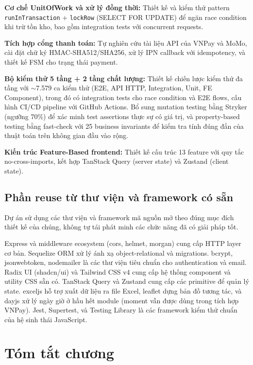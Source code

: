 \textbf{Cơ chế UnitOfWork và xử lý đồng thời:} Thiết kế và kiểm thử pattern \texttt{runInTransaction} + \texttt{lockRow} (SELECT FOR UPDATE) để ngăn race condition khi trừ tồn kho, bao gồm integration tests với concurrent requests.

\textbf{Tích hợp cổng thanh toán:} Tự nghiên cứu tài liệu API của VNPay và MoMo, cài đặt chữ ký HMAC-SHA512/SHA256, xử lý IPN callback với idempotency, và thiết kế FSM cho trạng thái payment.

\textbf{Bộ kiểm thử 5 tầng + 2 tầng chất lượng:} Thiết kế chiến lược kiểm thử đa tầng với $\sim$7.579 ca kiểm thử (E2E, API HTTP, Integration, Unit, FE Component), trong đó có integration tests cho race condition và E2E flows, cấu hình CI\slash CD pipeline với GitHub Actions. Bổ sung mutation testing bằng Stryker (ngưỡng 70\%) để xác minh test assertions thực sự có giá trị, và property-based testing bằng fast-check với 25 business invariants để kiểm tra tính đúng đắn của thuật toán trên không gian đầu vào rộng.

\textbf{Kiến trúc Feature-Based frontend:} Thiết kế cấu trúc 13 feature với quy tắc no-cross-imports, kết hợp TanStack Query (server state) và Zustand (client state).

\subsection{Phần reuse từ thư viện và framework có sẵn}

Dự án sử dụng các thư viện và framework mã nguồn mở theo đúng mục đích thiết kế của chúng, không tự tái phát minh các chức năng đã có giải pháp tốt.

Express và middleware ecosystem (cors, helmet, morgan) cung cấp HTTP layer cơ bản. Sequelize ORM xử lý ánh xạ object-relational và migrations. bcrypt, jsonwebtoken, nodemailer là các thư viện tiêu chuẩn cho authentication và email. Radix UI (shadcn/ui) và Tailwind CSS v4 cung cấp hệ thống component và utility CSS sẵn có. TanStack Query và Zustand cung cấp các primitive để quản lý state. exceljs hỗ trợ xuất dữ liệu ra file Excel, leaflet dựng bản đồ tương tác, và dayjs xử lý ngày giờ ở hầu hết module (moment vẫn được dùng trong tích hợp VNPay). Jest, Supertest, và Testing Library là các framework kiểm thử chuẩn của hệ sinh thái JavaScript.

\section{Tóm tắt chương}
\label{sec:c4_summary}

